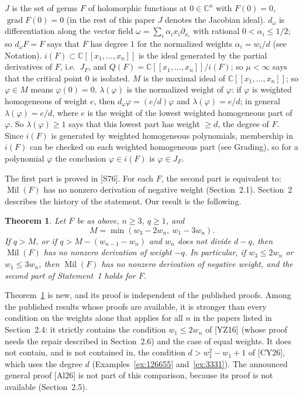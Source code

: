 \documentclass[11pt]{article}
\newcommand{\C}{\mathbb{C}}
\newcommand{\Mil}{\operatorname{Mil}(F)}
\newtheorem{theorem}{Theorem}[section]
\theoremstyle{remark}
\begin{document}
$J$ is the set of germs $F$ of holomorphic functions at $0\in\C^n$ with $F(0)=0$, $\operatorname{grad}F(0)=0$ (in the rest of this paper $J$ denotes the Jacobian ideal). $d_\omega$ is differentiation along the vector field $\omega=\sum_i\alpha_ix_i\partial_{x_i}$ with rational $0<\alpha_i\le1/2$; so $d_\omega F=F$ says that $F$ has degree $1$ for the normalized weights $\alpha_i=w_i/d$ (see Notation). $i(F)\subset\C[[x_1,\dots,x_n]]$ is the ideal generated by the partial derivatives of $F$, i.e.\ $J_F$, and $Q(F)=\C[[x_1,\dots,x_n]]/i(F)$; so $\mu<\infty$ says that the critical point $0$ is isolated. $M$ is the maximal ideal of $\C[[x_1,\dots,x_n]]$; so $\varphi\in M$ means $\varphi(0)=0$. $\lambda(\varphi)$ is the normalized weight of $\varphi$: if $\varphi$ is weighted homogeneous of weight $e$, then $d_\omega\varphi=(e/d)\varphi$ and $\lambda(\varphi)=e/d$; in general $\lambda(\varphi)=e/d$, where $e$ is the weight of the lowest weighted homogeneous part of $\varphi$. So $\lambda(\varphi)\ge1$ says that this lowest part has weight $\ge d$, the degree of $F$. Since $i(F)$ is generated by weighted homogeneous polynomials, membership in $i(F)$ can be checked on each weighted homogeneous part (see Grading), so for a polynomial $\varphi$ the conclusion $\varphi\in i(F)$ is $\varphi\in J_F$.

The first part is proved in [S76]. For each $F$, the second part is equivalent to: $\Mil$ has no nonzero derivation of negative weight (Section~2.1). Section~2 describes the history of the statement. Our result is the following.

\begin{theorem}\label{thm:main}
Let $F$ be as above, $n\ge3$, $q\ge1$, and
\[
M=\min(w_3-2w_n,\ w_1-3w_n).
\]
If $q>M$, or if $q>M-(w_{n-1}-w_n)$ and $w_n$ does not divide $d-q$, then $\Mil$ has no nonzero derivation of weight $-q$. In particular, if $w_3\le2w_n$ or $w_1\le3w_n$, then $\Mil$ has no nonzero derivation of negative weight, and the second part of Statement~1 holds for $F$.
\end{theorem}

Theorem~\ref{thm:main} is new, and its proof is independent of the published proofs. Among the published results whose proofs are available, it is stronger than every condition on the weights alone that applies for all $n$ in the papers listed in Section~2.4: it strictly contains the condition $w_1\le2w_n$ of [YZ16] (whose proof needs the repair described in Section~2.6) and the case of equal weights. It does not contain, and is not contained in, the condition $d>w_1^2-w_1+1$ of [CY26], which uses the degree $d$ (Examples~\ref{ex:126655} and~\ref{ex:3331}). The announced general proof [Al26] is not part of this comparison, because its proof is not available (Section~2.5).
\end{document}
